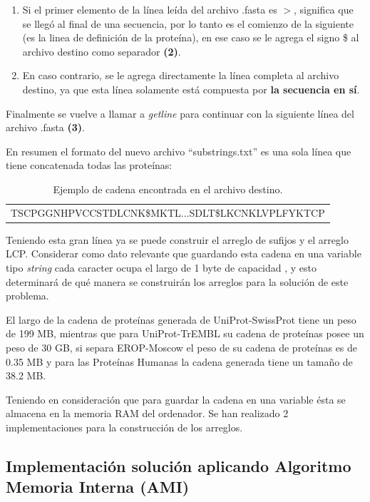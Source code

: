 \begin{enumerate}
\item Si el primer elemento de la línea leída del archivo .fasta es $>$, significa que se llegó al final de una secuencia, por lo tanto es el comienzo de la siguiente (es la linea de definición de la proteína), en ese caso se le agrega el signo \$ al archivo destino como separador \textbf{(2)}. 
\item En caso contrario, se le agrega directamente la línea completa al archivo destino, ya que esta línea solamente está compuesta por \textbf{la secuencia en sí}.
\end{enumerate}

Finalmente se vuelve a llamar a \textit{getline} para continuar con la siguiente línea del archivo .fasta \textbf{(3)}.

En resumen el formato del nuevo archivo ``substrings.txt'' es una sola línea que tiene concatenada todas las proteínas:

\begin{table}[h]
\centering
\label{propuesta-23}
\begin{tabular}{c}
TSCPGGNHPVCCSTDLCNK\$MKTL$\ldots$SDLT\$LKCNKLVPLFYKTCP\\ 
\end{tabular}
\caption{Ejemplo de cadena encontrada en el archivo destino.}
\end{table}

Teniendo esta gran línea ya se puede construir el arreglo de sufijos y el arreglo LCP. Considerar como dato relevante que guardando esta cadena en una variable tipo \textit{string} cada caracter ocupa el largo de 1 byte de capacidad \cite{manipulatingstrings}, y esto determinará de qué manera se construirán los arreglos para la solución de este problema.

El largo de la cadena de proteínas generada de UniProt-SwissProt tiene un peso de 199 MB, mientras que para UniProt-TrEMBL su cadena de proteínas posee un peso de 30 GB, si separa EROP-Moscow el peso de su cadena de proteínas es de 0.35 MB y para las Proteínas Humanas la cadena generada tiene un tamaño de 38.2 MB.

Teniendo en consideración que para guardar la cadena en una variable ésta se almacena en la memoria RAM del ordenador. Se han realizado 2 implementaciones para la construcción de los arreglos.

\subsection{Implementación solución aplicando Algoritmo Memoria Interna (AMI)}

